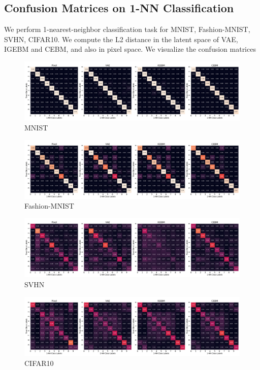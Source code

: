 \documentclass[tablecaption=bottom,wcp]{jmlr} %
\begin{document}
\subsection{Confusion Matrices on 1-NN Classification}
\label{appendix-sec:confuion matrices}
We perform 1-nearest-neighbor classification task for MNIST, Fashion-MNIST, SVHN, CIFAR10. We compute the L2 distance in the latent space of VAE, IGEBM and CEBM, and also in pixel space. We visualize the confusion matrices
\begin{figure}[!h]
\centering
\includegraphics[width=\linewidth]{figures/confusion_matrix_14row_mnist.pdf}
\caption{MNIST}
\label{appendix:confusion-matrices-mnist}
\end{figure}
\begin{figure}[!h]
\centering
\includegraphics[width=\linewidth]{figures/confusion_matrix_14row_fashionmnist.pdf}
\caption{Fashion-MNIST}
\label{appendix:confusion-matrices-fmnist}
\end{figure}
\vspace{-2em}
\begin{figure}[!h]
\centering
\includegraphics[width=\linewidth]{figures/confusion_matrix_14row_svhn.pdf}
\caption{SVHN}
\label{appendix:confusion-matrices-svhn}
\end{figure}
\vspace{-2em}
\begin{figure}[!h]
\centering
\includegraphics[width=\linewidth]{figures/confusion_matrix_14row_cifar10.pdf}
\caption{CIFAR10}
\label{appendix:confusion-matrices-cifar10}
\end{figure}
\end{document}
